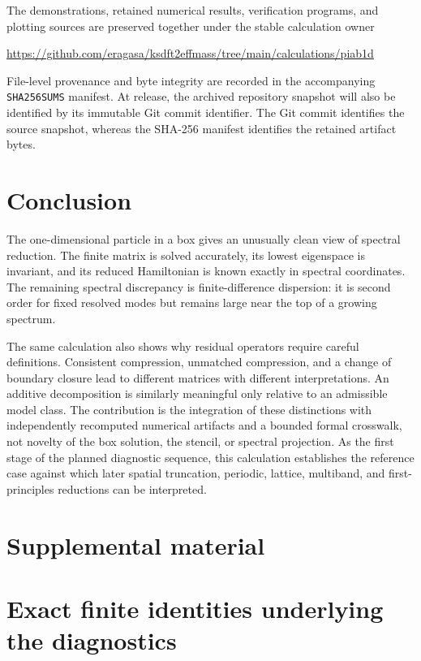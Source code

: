 \documentclass[11pt]{article}
\newcommand{\code}[1]{\texttt{#1}}
\begin{document}
The demonstrations, retained numerical results, verification programs, and plotting
sources are preserved together under the stable calculation owner
\begin{center}
\url{https://github.com/eragasa/ksdft2effmass/tree/main/calculations/piab1d}
\end{center}
File-level provenance and byte integrity are recorded in the accompanying
\code{SHA256SUMS} manifest. At release, the archived repository snapshot will also be
identified by its immutable Git commit identifier. The Git commit identifies the
source snapshot, whereas the SHA-256 manifest identifies the retained artifact bytes.

\section{Conclusion}

The one-dimensional particle in a box gives an unusually clean view of spectral
reduction. The finite matrix is solved accurately, its lowest eigenspace is invariant,
and its reduced Hamiltonian is known exactly in spectral coordinates. The remaining
spectral discrepancy is finite-difference dispersion: it is second order for fixed
resolved modes but remains large near the top of a growing spectrum.

The same calculation also shows why residual operators require careful definitions.
Consistent compression, unmatched compression, and a change of boundary closure lead
to different matrices with different interpretations. An additive decomposition is
similarly meaningful only relative to an admissible model class. The contribution is
the integration of these distinctions with independently recomputed numerical
artifacts and a bounded formal crosswalk, not novelty of the box solution, the stencil,
or spectral projection. As the first stage of the planned diagnostic sequence, this
calculation establishes the reference case against which later spatial truncation,
periodic, lattice, multiband, and first-principles reductions can be interpreted.




\clearpage
\appendix
\section*{Supplemental material}

\section{Exact finite identities underlying the diagnostics}
\label{app:exact-identities}
\end{document}
